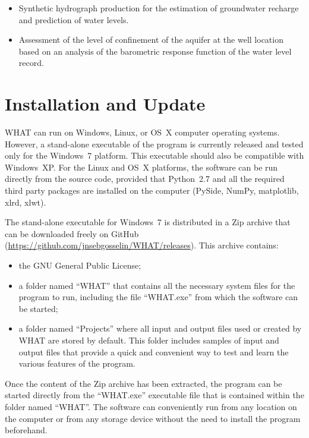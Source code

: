\documentclass[WHATMANUAL.tex]{subfiles}
\begin{document}
\begin{itemize}

\item Synthetic hydrograph production for the estimation of groundwater recharge and prediction of water levels.

\item Assessment of the level of confinement of the aquifer at the well location based on an analysis of the barometric response function of the water level record.

\end{itemize}

\section{Installation and Update}\label{sec:intallation}

WHAT can run on Windows, Linux, or OS~X computer operating systems. However, a stand-alone executable of the program is currently released and tested only for the Windows~7 platform. This executable should also be compatible with Windows~XP. For the Linux and OS~X platforms, the software can be run directly from the source code, provided that Python~2.7 and all the required third party packages are installed on the computer (PySide, NumPy, matplotlib, xlrd, xlwt).

The stand-alone executable for Windows~7 is distributed in a Zip archive that can be downloaded freely on GitHub (\url{https://github.com/jnsebgosselin/WHAT/releases}). This archive contains:

\begin{itemize}

\item the GNU General Public License;

\item a folder named ``WHAT'' that contains all the necessary system files for the program to run, including the file ``WHAT.exe'' from which the software can be started;

\item a folder named ``Projects'' where all input and output files used or created by WHAT are stored by default. This folder includes samples of input and output files that provide a quick and convenient way to test and learn the various features of the program.

\end{itemize}

Once the content of the Zip archive has been extracted, the program can be started directly from the ``WHAT.exe'' executable file that is contained within the folder named ``WHAT''. The software can conveniently run from any location on the computer or from any storage device without the need to install the program beforehand.
\end{document}
